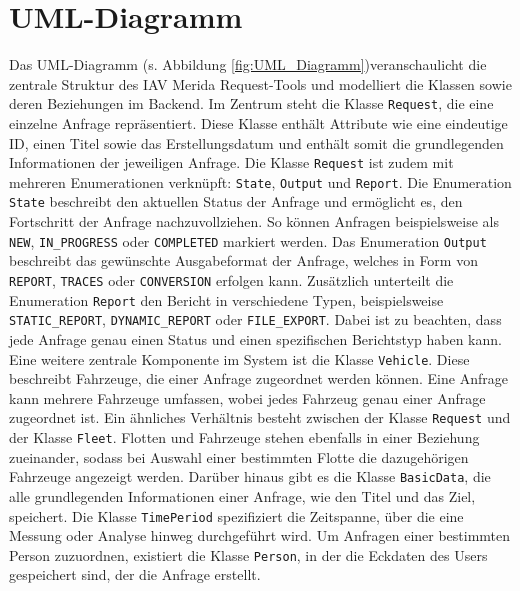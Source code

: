 \section{UML-Diagramm}
Das UML-Diagramm (s. Abbildung \ref{fig:UML_Diagramm})veranschaulicht die zentrale Struktur des IAV Merida Request-Tools und modelliert die Klassen sowie deren Beziehungen im Backend. Im Zentrum steht die Klasse \texttt{Request}, die eine einzelne Anfrage repräsentiert. Diese Klasse enthält Attribute wie eine eindeutige ID, einen Titel sowie das Erstellungsdatum und enthält somit die grundlegenden Informationen der jeweiligen Anfrage.
\newline
Die Klasse \texttt{Request} ist zudem mit mehreren Enumerationen verknüpft: \texttt{State}, \texttt{Output} und \texttt{Report}. Die Enumeration \texttt{State} beschreibt den aktuellen Status der Anfrage und ermöglicht es, den Fortschritt der Anfrage nachzuvollziehen. So können Anfragen beispielsweise als \texttt{NEW}, \texttt{IN\_PROGRESS} oder \texttt{COMPLETED} markiert werden. Das Enumeration \texttt{Output} beschreibt das gewünschte Ausgabeformat der Anfrage, welches in Form von \texttt{REPORT}, \texttt{TRACES} oder \texttt{CONVERSION} erfolgen kann. Zusätzlich unterteilt die Enumeration \texttt{Report} den Bericht in verschiedene Typen, beispielsweise \texttt{STATIC\_REPORT}, \texttt{DYNAMIC\_REPORT} oder \texttt{FILE\_EXPORT}. Dabei ist zu beachten, dass jede Anfrage genau einen Status und einen spezifischen Berichtstyp haben kann.
\newline
Eine weitere zentrale Komponente im System ist die Klasse \texttt{Vehicle}. Diese beschreibt Fahrzeuge, die einer Anfrage zugeordnet werden können. Eine Anfrage kann mehrere Fahrzeuge umfassen, wobei jedes Fahrzeug genau einer Anfrage zugeordnet ist. Ein ähnliches Verhältnis besteht zwischen der Klasse \texttt{Request} und der Klasse \texttt{Fleet}. Flotten und Fahrzeuge stehen ebenfalls in einer Beziehung zueinander, sodass bei Auswahl einer bestimmten Flotte die dazugehörigen Fahrzeuge angezeigt werden.
\newline
Darüber hinaus gibt es die Klasse \texttt{BasicData}, die alle grundlegenden Informationen einer Anfrage, wie den Titel und das Ziel, speichert. Die Klasse \texttt{TimePeriod} spezifiziert die Zeitspanne, über die eine Messung oder Analyse hinweg durchgeführt wird. Um Anfragen einer bestimmten Person zuzuordnen, existiert die Klasse \texttt{Person}, in der die Eckdaten des Users gespeichert sind, der die Anfrage erstellt.
\newline
